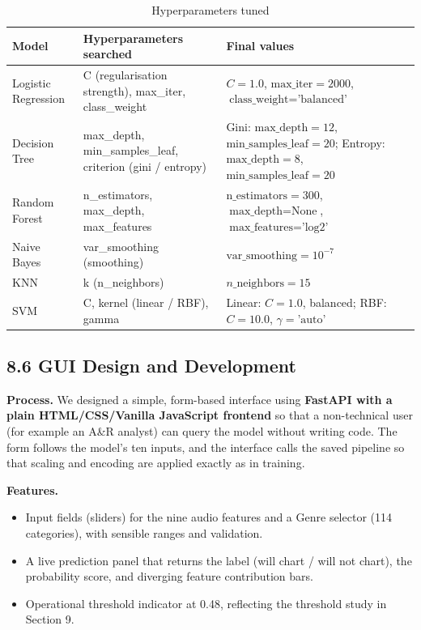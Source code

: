 \documentclass[11pt,a4paper]{article}
\begin{document}
\begin{table}[H]
\centering
\caption{Hyperparameters tuned}
\begin{tabular}{lp{5cm}p{5.2cm}}
\toprule
\textbf{Model} & \textbf{Hyperparameters searched} & \textbf{Final values} \\
\midrule
Logistic Regression & C (regularisation strength), max\_iter, class\_weight & $C = 1.0$, $\text{max\_iter} = 2000$, $\text{class\_weight} = \text{'balanced'}$ \\
Decision Tree & max\_depth, min\_samples\_leaf, criterion (gini / entropy) & Gini: $\text{max\_depth} = 12$, $\text{min\_samples\_leaf} = 20$; Entropy: $\text{max\_depth} = 8$, $\text{min\_samples\_leaf} = 20$ \\
Random Forest & n\_estimators, max\_depth, max\_features & $\text{n\_estimators} = 300$, $\text{max\_depth} = \text{None}$, $\text{max\_features} = \text{'log2'}$ \\
Naive Bayes & var\_smoothing (smoothing) & $\text{var\_smoothing} = 10^{-7}$ \\
KNN & k (n\_neighbors) & $n\_\text{neighbors} = 15$ \\
SVM & C, kernel (linear / RBF), gamma & Linear: $C = 1.0$, balanced; RBF: $C = 10.0$, $\gamma = \text{'auto'}$ \\
\bottomrule
\end{tabular}
\end{table}

\subsection*{8.6 GUI Design and Development}
\textbf{Process.} We designed a simple, form-based interface using \textbf{FastAPI with a plain HTML/CSS/Vanilla JavaScript frontend} so that a non-technical user (for example an A\&R analyst) can query the model without writing code. The form follows the model's ten inputs, and the interface calls the saved pipeline so that scaling and encoding are applied exactly as in training.

\textbf{Features.}
\begin{itemize}
  \item Input fields (sliders) for the nine audio features and a Genre selector (114 categories), with sensible ranges and validation.
  \item A live prediction panel that returns the label (will chart / will not chart), the probability score, and diverging feature contribution bars.
  \item Operational threshold indicator at 0.48, reflecting the threshold study in Section 9.
\end{itemize}
\end{document}

